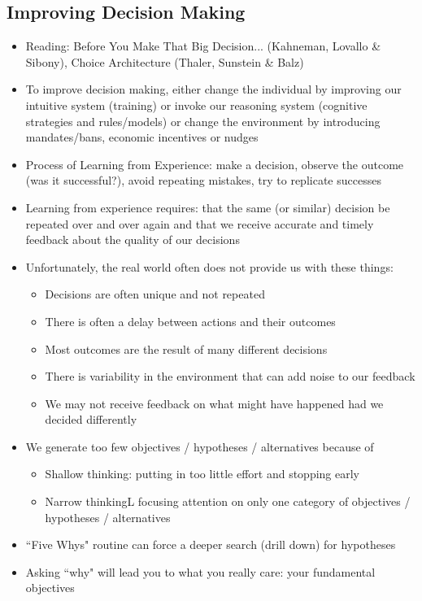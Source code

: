 \documentclass[12pt]{article}
\begin{document}
\subsection{Improving Decision Making}
\begin{itemize}
\item Reading: Before You Make That Big Decision... (Kahneman, Lovallo \& Sibony), Choice Architecture (Thaler, Sunstein \& Balz)
\item To improve decision making, either change the individual by improving our intuitive system (training) or invoke our reasoning system (cognitive strategies and rules/models) or change the environment by introducing mandates/bans, economic incentives or nudges 
\item Process of Learning from Experience: make a decision, observe the outcome (was it successful?), avoid repeating mistakes, try to replicate successes 
\item Learning from experience requires: that the same (or similar) decision be repeated over and over again and that we receive accurate and timely feedback about the quality of our decisions 
\item Unfortunately, the real world often does not provide us with these things: \begin{itemize} 
\item Decisions are often unique and not repeated 
\item There is often a delay between actions and their outcomes 
\item Most outcomes are the result of many different decisions 
\item There is variability in the environment that can add noise to our feedback 
\item We may not receive feedback on what might have happened had we decided differently \end{itemize} 
\item We generate too few objectives / hypotheses / alternatives because of \begin{itemize} 
\item Shallow thinking: putting in too little effort and stopping early 
\item Narrow thinkingL focusing attention on only one category of objectives / hypotheses / alternatives \end{itemize} 
\item ``Five Whys" routine can force a deeper search (drill down) for hypotheses
\item Asking ``why" will lead you to what you really care: your fundamental objectives 

\end{itemize}
\end{document}
